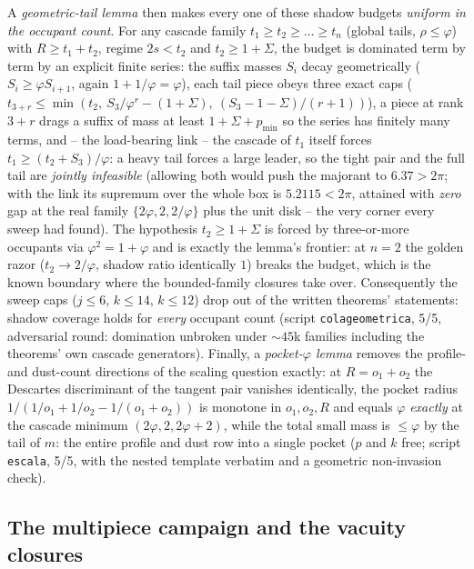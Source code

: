 \documentclass[11pt]{article}
\theoremstyle{definition}
\begin{document}
A \emph{geometric-tail lemma} then makes every one of these shadow
budgets \emph{uniform in the occupant count}. For any cascade
family $t_1\ge t_2\ge\dots\ge t_n$ (global tails, $\rho\le\varphi$)
with $R\ge t_1+t_2$, regime $2s<t_2$ and $t_2\ge1+\Sigma$, the
budget is dominated term by term by an explicit finite series: the
suffix masses $S_i$ decay geometrically
($S_i\ge\varphi S_{i+1}$, again $1+1/\varphi=\varphi$), each tail
piece obeys three exact caps
($t_{3+r}\le\min(t_2,\ S_3/\varphi^r-(1+\Sigma),\
(S_3-1-\Sigma)/(r+1))$), a piece at rank $3+r$ drags a suffix of
mass at least $1+\Sigma+p_{\min}$ so the series has finitely many
terms, and -- the load-bearing link -- the cascade of $t_1$ itself
forces $t_1\ge(t_2+S_3)/\varphi$: a heavy tail forces a large
leader, so the tight pair and the full tail are \emph{jointly
infeasible} (allowing both would push the majorant to $6.37>2\pi$;
with the link its supremum over the whole box is $5.2115<2\pi$,
attained with \emph{zero} gap at the real family
$\{2\varphi,2,2/\varphi\}$ plus the unit disk -- the very corner
every sweep had found). The hypothesis $t_2\ge1+\Sigma$ is forced
by three-or-more occupants via $\varphi^2=1+\varphi$ and is exactly
the lemma's frontier: at $n=2$ the golden razor
($t_2\to2/\varphi$, shadow ratio identically $1$) breaks the
budget, which is the known boundary where the bounded-family
closures take over. Consequently the sweep caps ($j\le6$, $k\le14$,
$k\le12$) drop out of the written theorems' statements: shadow
coverage holds for \emph{every} occupant count (script
\texttt{colageometrica}, 5/5, adversarial round: domination
unbroken under ${\sim}45$k families including the theorems' own
cascade generators). Finally, a
\emph{pocket-$\varphi$ lemma} removes the profile- and dust-count
directions of the scaling question exactly: at $R=o_1+o_2$ the
Descartes discriminant of the tangent pair vanishes identically, the
pocket radius $1/(1/o_1+1/o_2-1/(o_1+o_2))$ is monotone in
$o_1,o_2,R$ and equals $\varphi$ \emph{exactly} at the cascade
minimum $(2\varphi,2,2\varphi+2)$, while the total small mass is
$\le\varphi$ by the tail of $m$: the entire profile and dust row
into a single pocket ($p$ and $k$ free; script \texttt{escala}, 5/5,
with the nested template verbatim and a geometric non-invasion
check).

\subsection*{The multipiece campaign and the vacuity closures}
\end{document}
